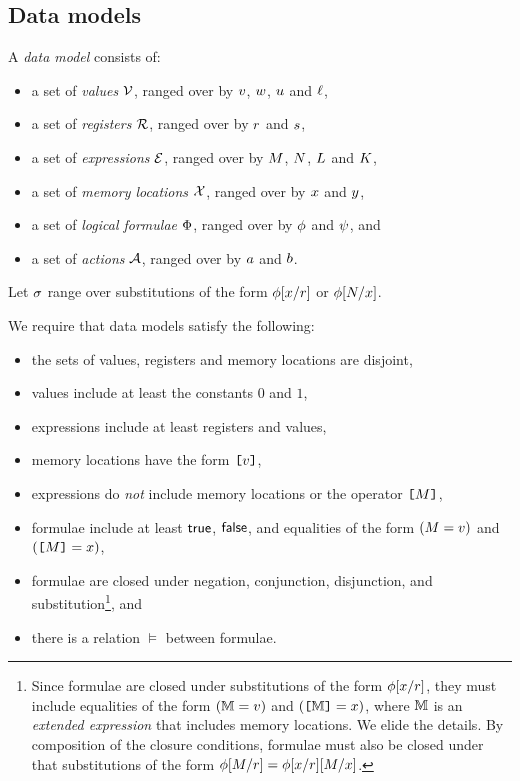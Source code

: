 



\subsection{Data models}
\label{sec:preliminaries}

A \emph{data model} consists of:
\begin{itemize}
\item a set of \emph{values} $\mathcal{V}$, ranged over by
  $v$, $w$, $u$ and $\ell$,
\item a set of \emph{registers} $\mathcal{R}$, ranged over by
  $r$ and $s$,
\item a set of \emph{expressions} $\mathcal{E}$, ranged over by
  $M$, $N$, $L$ and $K$,
\item a set of \emph{memory locations} $\mathcal{X}$, ranged over by $x$ and
  $y$, 
\item a set of \emph{logical formulae} $\Phi$, ranged over by
  $\phi$ and $\psi$, and
\item a set of \emph{actions} $\mathcal{A}$, ranged over by $a$ and $b$.
\end{itemize}

Let $\sigma$ range over substitutions of the form
$\phi[x/r]$ or $\phi[N/x]$.

We require that data models satisfy the following:
\begin{itemize}
\item the sets of values, registers and memory locations are disjoint,
\item values include at least the constants $0$ and $1$,
\item expressions include at least registers and values,
\item memory locations have the form $\texttt{[}v\texttt{]}$,
\item expressions do \emph{not} include memory locations or the operator $\texttt{[}M\texttt{]}$,
\item formulae include at least $\mathsf{true}$, $\mathsf{false}$, and equalities of the form
  $(M=v)$ and $(\texttt{[}M\texttt{]}=x)$,
\item formulae are closed under negation, conjunction, disjunction, and
  substitution\footnote{Since formulae are closed under substitutions of the
    form $\phi[x/r]$, they must include equalities of the form
    $(\mathbb{M}=v)$ and $(\texttt{[}\mathbb{M}\texttt{]}=x)$, where $\mathbb{M}$ is an
    \emph{extended expression} that includes memory locations.  We elide the
    details.  By composition of the closure conditions, formulae must also be
    closed under that substitutions of the form
    $\phi[M/r]=\phi[x/r][M/x]$.}, and
\item there is a relation $\vDash$ between formulae.
\end{itemize}

